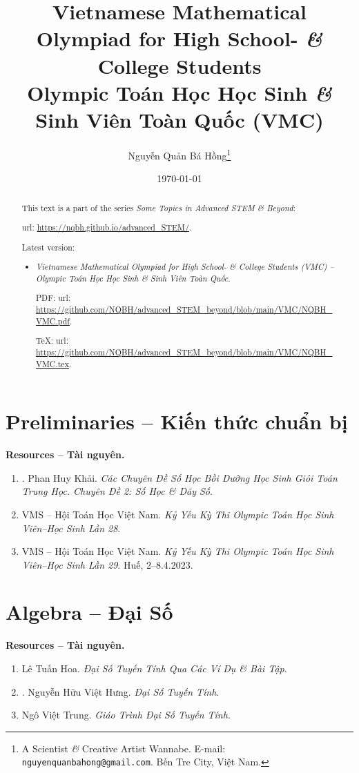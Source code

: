 \documentclass{article}
\title{Vietnamese Mathematical Olympiad for High School- {\it\&} College Students\\Olympic Toán Học Học Sinh {\it\&} Sinh Viên Toàn Quốc (VMC)}
\author{Nguyễn Quản Bá Hồng\footnote{A Scientist {\it\&} Creative Artist Wannabe. E-mail: {\tt nguyenquanbahong@gmail.com}. Bến Tre City, Việt Nam.}}
\date{\today}
\begin{document}
\maketitle
\begin{abstract}
	This text is a part of the series {\it Some Topics in Advanced STEM \& Beyond}:
	
	{\sc url}: \url{https://nqbh.github.io/advanced_STEM/}.
	
	Latest version:
	\begin{itemize}
		\item {\it Vietnamese Mathematical Olympiad for High School- \& College Students (VMC) -- Olympic Toán Học Học Sinh \& Sinh Viên Toàn Quốc}.
		
		PDF: {\sc url}: \url{https://github.com/NQBH/advanced_STEM_beyond/blob/main/VMC/NQBH_VMC.pdf}.
		
		\TeX: {\sc url}: \url{https://github.com/NQBH/advanced_STEM_beyond/blob/main/VMC/NQBH_VMC.tex}.
	\end{itemize}
\end{abstract}
\tableofcontents


\section{Preliminaries -- Kiến thức chuẩn bị}

\textbf{\textsf{Resources -- Tài nguyên.}}
\begin{enumerate}
	\item \cite{Khai_so_hoc_day_so}. {\sc Phan Huy Khải}. {\it Các Chuyên Đề Số Học Bồi Dưỡng Học Sinh Giỏi Toán Trung Học. Chuyên Đề 2: Số Học \& Dãy Số}.
	\item {\sc VMS -- Hội Toán Học Việt Nam}. {\it Kỷ Yếu Kỳ Thi Olympic Toán Học Sinh Viên--Học Sinh Lần 28}.
	\item {\sc VMS -- Hội Toán Học Việt Nam}. {\it Kỷ Yếu Kỳ Thi Olympic Toán Học Sinh Viên--Học Sinh Lần 29}. Huế, 2--8.4.2023.
\end{enumerate}

\section{Algebra -- Đại Số}
\textbf{\textsf{Resources -- Tài nguyên.}}
\begin{enumerate}
	\item {\sc Lê Tuấn Hoa}. {\it Đại Số Tuyến Tính Qua Các Ví Dụ \& Bài Tập}.
	\item \cite{Hung_linear_algebra}. {\sc Nguyễn Hữu Việt Hưng}. {\it Đại Số Tuyến Tính}.
	\item {\sc Ngô Việt Trung}. {\it Giáo Trình Đại Số Tuyến Tính}.
\end{enumerate}
\end{document}
